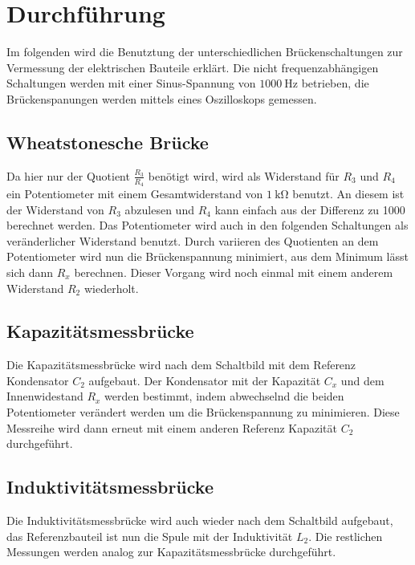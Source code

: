 \section{Durchführung}

    \noindent Im folgenden wird die Benutztung der unterschiedlichen Brückenschaltungen zur Vermessung der elektrischen Bauteile erklärt. Die 
    nicht frequenzabhängigen Schaltungen werden mit einer Sinus-Spannung von $\SI{1000}{\hertz}$ betrieben, die Brückenspanungen werden mittels 
    eines Oszilloskops gemessen.

    \subsection{Wheatstonesche Brücke}

        \noindent Da hier nur der Quotient $\frac{R_3}{R_4}$ benötigt wird, wird als Widerstand für $R_3$ und $R_4$ ein Potentiometer mit 
        einem Gesamtwiderstand von $\SI{1}{\kilo\ohm}$ benutzt. An diesem ist der Widerstand von $R_3$ abzulesen und $R_4$ kann einfach 
        aus der Differenz zu 1000 berechnet werden. Das Potentiometer wird auch in den folgenden Schaltungen als veränderlicher Widerstand 
        benutzt. Durch variieren des Quotienten an dem Potentiometer wird nun die Brückenspannung minimiert, aus dem Minimum lässt sich dann 
        $R_x$ berechnen. Dieser Vorgang wird noch einmal mit einem anderem Widerstand $R_2$ wiederholt.

    \subsection{Kapazitätsmessbrücke}

        \noindent Die Kapazitätsmessbrücke wird nach dem Schaltbild mit dem Referenz Kondensator $C_2$ aufgebaut. Der Kondensator mit der 
        Kapazität $C_x$ und dem Innenwidestand $R_x$ werden bestimmt, indem abwechselnd die beiden Potentiometer verändert werden um die 
        Brückenspannung zu minimieren. Diese Messreihe wird dann erneut mit einem anderen Referenz Kapazität $C_2$ durchgeführt.

    \subsection{Induktivitätsmessbrücke}

        \noindent Die Induktivitätsmessbrücke wird auch wieder nach dem Schaltbild aufgebaut, das Referenzbauteil ist nun die Spule mit 
        der Induktivität $L_2$. Die restlichen Messungen werden analog zur Kapazitätsmessbrücke durchgeführt.


